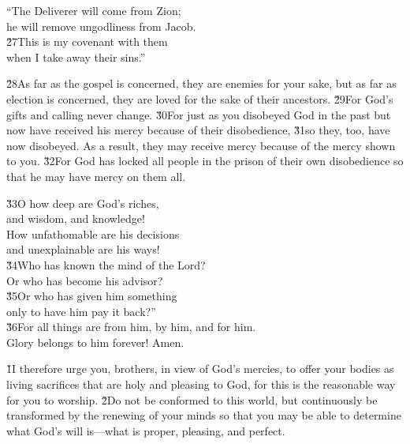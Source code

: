 \begin{poetry}
\poeml ``The Deliverer will come from Zion; \\
\poemll    he will remove ungodliness from Jacob. \\
\poeml \v{27}This is my covenant with them \\
\poemll    when I take away their sins.''
\end{poetry}

\v{28}As far as the gospel is concerned, they are enemies for your sake, but as far as election is concerned, they are loved for the sake of their ancestors. \v{29}For God's gifts and calling never change. \v{30}For just as you disobeyed God in the past but now have received his mercy because of their disobedience, \v{31}so they, too, have now disobeyed. As a result, they may receive mercy because of the mercy shown to you. \v{32}For God has locked all people in the prison of their own disobedience so that he may have mercy on them all.

\begin{poetry}
\poeml \v{33}O how deep are God's riches, \\
\poemll    and wisdom, and knowledge! \\
\poeml How unfathomable are his decisions \\
\poemll    and unexplainable are his ways! \\
\poeml \v{34}Who has known the mind of the Lord? \\
\poemll    Or who has become his advisor? \\
\poeml \v{35}Or who has given him something \\
\poemll    only to have him pay it back?'' \\
\poeml \v{36}For all things are from him, by him, and for him. \\
\poemll    Glory belongs to him forever! Amen.
\end{poetry}

\v{1}I therefore urge you, brothers, in view of God's mercies, to offer your bodies as living sacrifices that are holy and pleasing to God, for this is the reasonable way for you to worship. \v{2}Do not be conformed to this world, but continuously be transformed by the renewing of your minds so that you may be able to determine what God's will is---what is proper, pleasing, and perfect.

